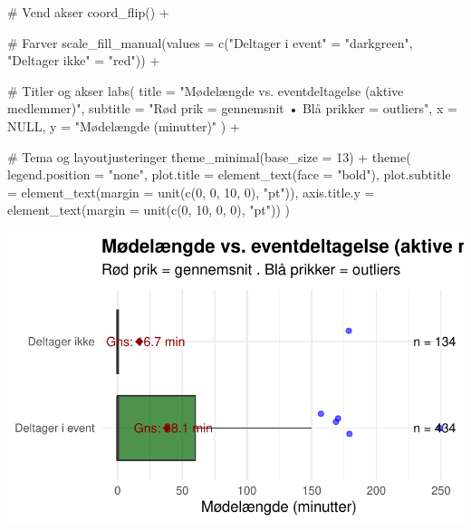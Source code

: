\documentclass[
  11pt,
  letterpaper,
  DIV=11,
  numbers=noendperiod]{scrartcl}
\newenvironment{Shaded}{\begin{snugshade}}{\end{snugshade}}
\newcommand{\AttributeTok}[1]{\textcolor[rgb]{0.40,0.45,0.13}{#1}}
\newcommand{\CommentTok}[1]{\textcolor[rgb]{0.37,0.37,0.37}{#1}}
\newcommand{\ConstantTok}[1]{\textcolor[rgb]{0.56,0.35,0.01}{#1}}
\newcommand{\DecValTok}[1]{\textcolor[rgb]{0.68,0.00,0.00}{#1}}
\newcommand{\FunctionTok}[1]{\textcolor[rgb]{0.28,0.35,0.67}{#1}}
\newcommand{\NormalTok}[1]{\textcolor[rgb]{0.00,0.23,0.31}{#1}}
\newcommand{\OtherTok}[1]{\textcolor[rgb]{0.00,0.23,0.31}{#1}}
\newcommand{\SpecialCharTok}[1]{\textcolor[rgb]{0.37,0.37,0.37}{#1}}
\newcommand{\StringTok}[1]{\textcolor[rgb]{0.13,0.47,0.30}{#1}}
\begin{document}
\begin{Shaded}
\begin{Highlighting}[]
  \CommentTok{\# Vend akser}
  \FunctionTok{coord\_flip}\NormalTok{() }\SpecialCharTok{+}
  
  \CommentTok{\# Farver}
  \FunctionTok{scale\_fill\_manual}\NormalTok{(}\AttributeTok{values =} \FunctionTok{c}\NormalTok{(}\StringTok{"Deltager i event"} \OtherTok{=} \StringTok{"darkgreen"}\NormalTok{, }
                               \StringTok{"Deltager ikke"} \OtherTok{=} \StringTok{"red"}\NormalTok{)) }\SpecialCharTok{+}
  
  \CommentTok{\# Titler og akser}
  \FunctionTok{labs}\NormalTok{(}
    \AttributeTok{title =} \StringTok{"Mødelængde vs. eventdeltagelse (aktive medlemmer)"}\NormalTok{,}
    \AttributeTok{subtitle =} \StringTok{"Rød prik = gennemsnit • Blå prikker = outliers"}\NormalTok{,}
    \AttributeTok{x =} \ConstantTok{NULL}\NormalTok{,}
    \AttributeTok{y =} \StringTok{"Mødelængde (minutter)"}
\NormalTok{  ) }\SpecialCharTok{+}
  
  \CommentTok{\# Tema og layoutjusteringer}
  \FunctionTok{theme\_minimal}\NormalTok{(}\AttributeTok{base\_size =} \DecValTok{13}\NormalTok{) }\SpecialCharTok{+}
  \FunctionTok{theme}\NormalTok{(}
  \AttributeTok{legend.position =} \StringTok{"none"}\NormalTok{,}
  \AttributeTok{plot.title =} \FunctionTok{element\_text}\NormalTok{(}\AttributeTok{face =} \StringTok{"bold"}\NormalTok{),}
  \AttributeTok{plot.subtitle =} \FunctionTok{element\_text}\NormalTok{(}\AttributeTok{margin =} \FunctionTok{unit}\NormalTok{(}\FunctionTok{c}\NormalTok{(}\DecValTok{0}\NormalTok{, }\DecValTok{0}\NormalTok{, }\DecValTok{10}\NormalTok{, }\DecValTok{0}\NormalTok{), }\StringTok{"pt"}\NormalTok{)),}
  \AttributeTok{axis.title.y =} \FunctionTok{element\_text}\NormalTok{(}\AttributeTok{margin =} \FunctionTok{unit}\NormalTok{(}\FunctionTok{c}\NormalTok{(}\DecValTok{0}\NormalTok{, }\DecValTok{10}\NormalTok{, }\DecValTok{0}\NormalTok{, }\DecValTok{0}\NormalTok{), }\StringTok{"pt"}\NormalTok{))}
\NormalTok{  )}
\end{Highlighting}
\end{Shaded}

\includegraphics{Quarto_files/figure-pdf/unnamed-chunk-6-7.pdf}
\end{document}
